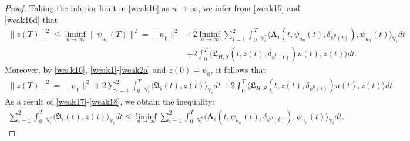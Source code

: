 \documentclass[11pt]{article}
\renewcommand{\leq}{\leqslant}
\numberwithin{equation}{section}
\begin{document}
\begin{proof}
Taking the inferior limit in \eqref{weak16} as $n\rightarrow\infty$, we infer from \eqref{weak15} and \eqref{weak16d} that
\begin{align}\label{weak17}
\|z(T)\|^2\leq
\liminf_{n\rightarrow\infty}
\|\psi_{u_n}(T)\|^2=\|\psi_0\|^2 &+2\liminf_{n\rightarrow\infty}\sum_{i=1}^2\int_0^T
\ _{\mathbb{V}_i^*}\big\langle \mathbf{A}_i(t,\psi_{u_n}(t),
\delta_{\psi^0(t)}),
\psi_{u_n}(t)\big  \rangle_{\mathbb{V}_i}       dt
\nonumber\\& + 2 \int_0^T\big\langle\mathfrak{L}_{H,S}
 (t,z(t),
\delta_{\psi^0(t)})u(t) , z(t)\big\rangle dt.
\end{align}
Moreover, by \eqref{weak10}, \eqref{weak1}-\eqref{weak2a} and $z(0)=\psi_0$, it follows that
\begin{align}\label{weak18}
 \|z(T)\|^2=\|\psi_0\|^2
+2\sum_{i=1}^2\int_0^T
\ _{\mathbb{V}_i^*}\big\langle \mathfrak{A}_i(t),
z(t)\big  \rangle_{\mathbb{V}_i}dt
 +2\int_0^T\big\langle\mathfrak{L}_{H,S}
 (t,z(t),
\delta_{\psi^0(t)})u(t) , z(t)\big\rangle dt.
\end{align}
As a result of \eqref{weak17}-\eqref{weak18}, we obtain the inequality:
\begin{align}\label{weak19}
\sum_{i=1}^2\int_0^T
\ _{\mathbb{V}_i^*}\big\langle \mathfrak{A}_i(t),
z(t)\big  \rangle_{\mathbb{V}_i}dt\leq
\liminf_{n\rightarrow\infty}\sum_{i=1}^2\int_0^T
\ _{\mathbb{V}_i^*}\big\langle \mathbf{A}_i(t,\psi_{u_n}(t),
\delta_{\psi^0(t)}),
\psi_{u_n}(t)\big  \rangle_{\mathbb{V}_i}       dt.
\end{align}


\end{proof}
\end{document}
